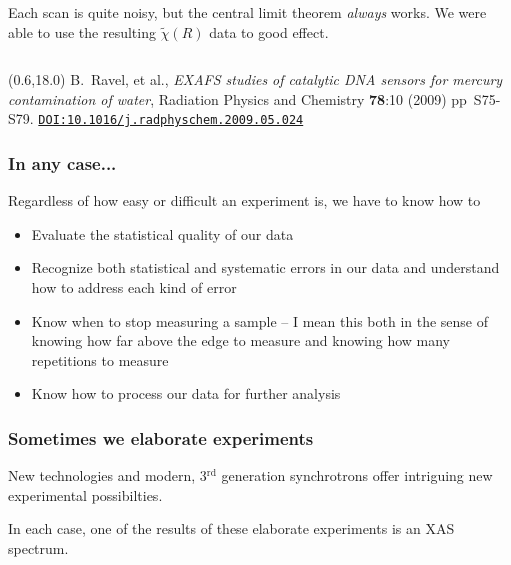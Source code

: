 \documentclass[10pt, xcolor=x11names, compress]{beamer}
\begin{document}
\begin{frame}
\begin{columns}
\begin{column}{0.60\linewidth}
      \medskip

      Each scan is quite noisy, but the central limit theorem
      \textit{always} works.  We were able to use the resulting
      $\tilde\chi(R)$ data to good effect.
    \end{column}
  \end{columns}
  \begin{textblock*}{0.4\linewidth}(0.6\linewidth,18.0\TPVertModule)%
    \tiny%
    B.\ Ravel, et al., \textit{EXAFS studies of catalytic DNA sensors
      for mercury contamination of water}, Radiation Physics and
    Chemistry \textbf{78}:10 (2009) pp\ S75-S79.
    \href{http://dx.doi.org/10.1016/j.radphyschem.2009.05.024}
    {\color{Blue4}\texttt{DOI:10.1016/j.radphyschem.2009.05.024}}
  \end{textblock*}
\end{frame}

\begin{frame}
  \frametitle{In any case...}
  Regardless of how easy or difficult an experiment is, we have to
  know how to
  \begin{itemize}
  \item<1-> Evaluate the statistical quality of our data
  \item<2-> Recognize both statistical and systematic errors in our data
    and understand how to address each kind of error
  \item<3-> Know when to stop measuring a sample -- I mean this both in
    the sense of knowing how far above the edge to measure and knowing
    how many repetitions to measure
  \item<4-> Know how to process our data for further analysis
  \end{itemize}
\end{frame}

\begin{frame}
  \frametitle{Sometimes we elaborate experiments}
  \begin{block}{}
    New technologies and modern, 3$^{\mathrm{rd}}$ generation
    synchrotrons offer intriguing new experimental possibilties.
  \end{block}

  \bigskip

  \begin{alertblock}{}
    In each case, one of the results of these elaborate experiments is
    an XAS spectrum.
  \end{alertblock}
\end{frame}
\end{document}
